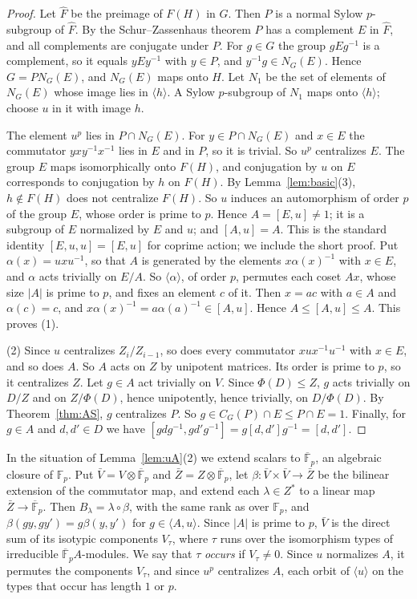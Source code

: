 \documentclass[11pt]{amsart}
\theoremstyle{definition}
\theoremstyle{remark}
\newcommand{\F}{\mathbb{F}}
\newcommand{\Kb}{\overline{\F}_p}
\begin{document}
\begin{proof}
Let $\hat F$ be the preimage of $F(H)$ in $G$. Then $P$ is a normal Sylow $p$-subgroup of $\hat F$. By the Schur--Zassenhaus theorem $P$ has a complement $E$ in $\hat F$, and all complements are conjugate under $P$. For $g\in G$ the group $gEg^{-1}$ is a complement, so it equals $yEy^{-1}$ with $y\in P$, and $y^{-1}g\in N_G(E)$. Hence $G=PN_G(E)$, and $N_G(E)$ maps onto $H$. Let $N_1$ be the set of elements of $N_G(E)$ whose image lies in $\langle h\rangle$. A Sylow $p$-subgroup of $N_1$ maps onto $\langle h\rangle$; choose $u$ in it with image $h$.

The element $u^p$ lies in $P\cap N_G(E)$. For $y\in P\cap N_G(E)$ and $x\in E$ the commutator $yxy^{-1}x^{-1}$ lies in $E$ and in $P$, so it is trivial. So $u^p$ centralizes $E$. The group $E$ maps isomorphically onto $F(H)$, and conjugation by $u$ on $E$ corresponds to conjugation by $h$ on $F(H)$. By Lemma~\ref{lem:basic}(3), $h\notin F(H)$ does not centralize $F(H)$. So $u$ induces an automorphism of order $p$ of the group $E$, whose order is prime to $p$. Hence $A=[E,u]\ne1$; it is a subgroup of $E$ normalized by $E$ and $u$; and $[A,u]=A$. This is the standard identity $[E,u,u]=[E,u]$ for coprime action; we include the short proof. Put $\alpha(x)=uxu^{-1}$, so that $A$ is generated by the elements $x\alpha(x)^{-1}$ with $x\in E$, and $\alpha$ acts trivially on $E/A$. So $\langle\alpha\rangle$, of order $p$, permutes each coset $Ax$, whose size $|A|$ is prime to $p$, and fixes an element $c$ of it. Then $x=ac$ with $a\in A$ and $\alpha(c)=c$, and $x\alpha(x)^{-1}=a\alpha(a)^{-1}\in[A,u]$. Hence $A\le[A,u]\le A$. This proves (1).

(2) Since $u$ centralizes $Z_i/Z_{i-1}$, so does every commutator $xux^{-1}u^{-1}$ with $x\in E$, and so does $A$. So $A$ acts on $Z$ by unipotent matrices. Its order is prime to $p$, so it centralizes $Z$. Let $g\in A$ act trivially on $V$. Since $\Phi(D)\le Z$, $g$ acts trivially on $D/Z$ and on $Z/\Phi(D)$, hence unipotently, hence trivially, on $D/\Phi(D)$. By Theorem~\ref{thm:AS}, $g$ centralizes $P$. So $g\in C_G(P)\cap E\le P\cap E=1$. Finally, for $g\in A$ and $d,d'\in D$ we have $[gdg^{-1},gd'g^{-1}]=g[d,d']g^{-1}=[d,d']$.
\end{proof}


In the situation of Lemma~\ref{lem:uA}(2) we extend scalars to $\Kb$, an algebraic closure of $\F_p$. Put $\bar V=V\otimes\Kb$ and $\bar Z=Z\otimes\Kb$, let $\beta\colon\bar V\times\bar V\to\bar Z$ be the bilinear extension of the commutator map, and extend each $\lambda\in Z^*$ to a linear map $\bar Z\to\Kb$. Then $B_\lambda=\lambda\circ\beta$, with the same rank as over $\F_p$, and $\beta(gy,gy')=g\beta(y,y')$ for $g\in\langle A,u\rangle$. Since $|A|$ is prime to $p$, $\bar V$ is the direct sum of its isotypic components $V_\tau$, where $\tau$ runs over the isomorphism types of irreducible $\Kb A$-modules. We say that $\tau$ \emph{occurs} if $V_\tau\ne0$. Since $u$ normalizes $A$, it permutes the components $V_\tau$, and since $u^p$ centralizes $A$, each orbit of $\langle u\rangle$ on the types that occur has length $1$ or $p$.
\end{document}

